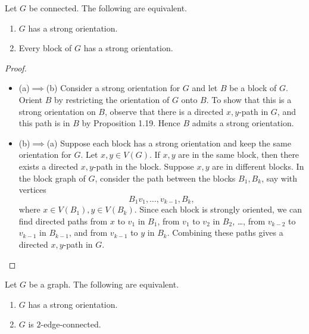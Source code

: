 \documentclass[co342]{subfiles}
\begin{document}
    \begin{theorem}{}
        Let $G$ be connected. The following are equivalent.
        \begin{enumerate}
            \item $G$ has a strong orientation.
            \item Every block of $G$ has a strong orientation.
        \end{enumerate}
    \end{theorem}

    \begin{proof}
        \begin{itemize}
            \item (a)$\implies$(b) Consider a strong orientation for $G$ and let $B$ be a block of $G$. Orient $B$ by restricting the orientation of $G$ onto $B$. To show that this is a strong orientation on $B$, observe that there is a directed $x,y$-path in $G$, and this path is in $B$ by Proposition 1.19. Hence $B$ admits a strong orientation.
            \item (b)$\implies$(a) Suppose each block has a strong orientation and keep the same orientation for $G$. Let $x,y\in V\left( G \right)$. If $x,y$ are in the same block, then there exists a directed $x,y$-path in the block. Suppose $x,y$ are in different blocks. In the block graph of $G$, consider the path between the blocks $B_1,B_k$, say with vertices
                \begin{equation*}
                    B_1v_1,\ldots,v_{k-1},B_k,
                \end{equation*}
                where $x\in V\left( B_1 \right), y\in V\left( B_k \right)$. Since each block is strongly oriented, we can find directed paths from $x$ to $v_1$ in $B_1$, from $v_1$ to $v_2$ in $B_2$, \ldots, from $v_{k-2}$ to $v_{k-1}$ in $B_{k-1}$, and from $v_{k-1}$ to $y$ in $B_k$. Combining these paths gives a directed $x,y$-path in $G$. \qqedsym
        \end{itemize} 
    \end{proof}

    \clearpage
    \begin{cor}{}
        Let $G$ be a graph. The following are equivalent.
        \begin{enumerate}
            \item $G$ has a strong orientation.
            \item $G$ is $2$-edge-connected.
        \end{enumerate}
    \end{cor}	
\end{document}
